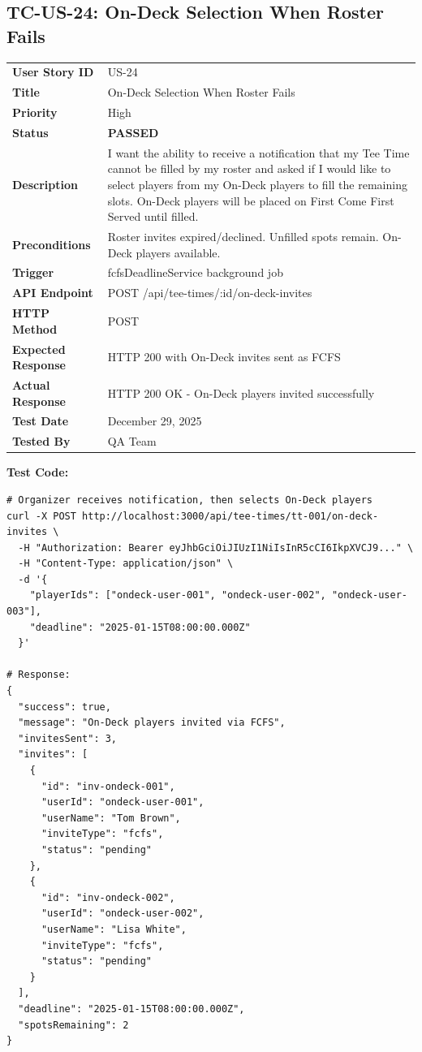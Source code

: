 \documentclass[11pt,a4paper]{article}
\newcommand{\passed}{\textcolor{pass}{\textbf{PASSED}}}
\begin{document}
\vspace{0.5cm}


\subsection{TC-US-24: On-Deck Selection When Roster Fails}

\begin{tabularx}{\textwidth}{|p{3.2cm}|Y|}
\hline
{}
 \\
\hline
\textbf{User Story ID} & US-24 \\
\hline
\textbf{Title} & On-Deck Selection When Roster Fails \\
\hline
\textbf{Priority} & High \\
\hline
\textbf{Status} & \passed \\
\hline
\textbf{Description} & I want the ability to receive a notification that my Tee Time cannot be filled by my roster and asked if I would like to select players from my On-Deck players to fill the remaining slots. On-Deck players will be placed on First Come First Served until filled. \\
\hline
\textbf{Preconditions} & Roster invites expired/declined. Unfilled spots remain. On-Deck players available. \\
\hline
\textbf{Trigger} & fcfsDeadlineService background job \\
\hline
\textbf{API Endpoint} & POST /api/tee-times/:id/on-deck-invites \\
\hline
\textbf{HTTP Method} & POST \\
\hline
\textbf{Expected Response} & HTTP 200 with On-Deck invites sent as FCFS \\
\hline
\textbf{Actual Response} & HTTP 200 OK - On-Deck players invited successfully \\
\hline
\textbf{Test Date} & December 29, 2025 \\
\hline
\textbf{Tested By} & QA Team \\
\hline
\end{tabularx}

\vspace{0.3cm}
\textbf{Test Code:}
\begin{lstlisting}
# Organizer receives notification, then selects On-Deck players
curl -X POST http://localhost:3000/api/tee-times/tt-001/on-deck-invites \
  -H "Authorization: Bearer eyJhbGciOiJIUzI1NiIsInR5cCI6IkpXVCJ9..." \
  -H "Content-Type: application/json" \
  -d '{
    "playerIds": ["ondeck-user-001", "ondeck-user-002", "ondeck-user-003"],
    "deadline": "2025-01-15T08:00:00.000Z"
  }'

# Response:
{
  "success": true,
  "message": "On-Deck players invited via FCFS",
  "invitesSent": 3,
  "invites": [
    {
      "id": "inv-ondeck-001",
      "userId": "ondeck-user-001",
      "userName": "Tom Brown",
      "inviteType": "fcfs",
      "status": "pending"
    },
    {
      "id": "inv-ondeck-002",
      "userId": "ondeck-user-002",
      "userName": "Lisa White",
      "inviteType": "fcfs",
      "status": "pending"
    }
  ],
  "deadline": "2025-01-15T08:00:00.000Z",
  "spotsRemaining": 2
}
\end{lstlisting}
\end{document}
